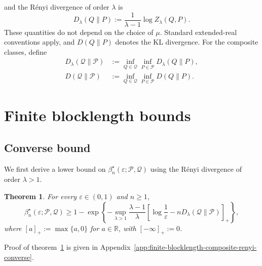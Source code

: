 \documentclass[journal,12pt,draftclsnofoot,onecolumn]{IEEEtran}
\newtheorem{theorem}{Theorem}
\begin{document}
and the R\'enyi divergence of order $\lambda$ is
\begin{equation}
D_\lambda(Q\|P):=\frac{1}{\lambda-1}\log Z_\lambda(Q,P).
\label{eq:renyi-divergence-definition}
\end{equation}
These quantities do not depend on the choice of $\mu$. Standard extended-real conventions apply, and $D(Q\|P)$ denotes the KL divergence. For the composite classes, define
\begin{equation}
\begin{aligned}
D_\lambda(\mathcal Q\|\mathcal P) &:= \inf_{Q\in\mathcal Q}
\inf_{P\in\mathcal P} D_\lambda(Q\|P),\\
D(\mathcal Q\|\mathcal P) &:= \inf_{Q\in\mathcal Q} \inf_{P\in\mathcal P} D(Q\|P).
\label{eq:inf-KL}
\end{aligned}
\end{equation}
\section{Finite blocklength bounds}
\label{sec:finite-blocklength-bounds}

\subsection{Converse bound}
\label{sec:composite-converse}

We first derive a lower bound on $\beta_n^\star(\varepsilon;\mathcal P,\mathcal Q)$ using the R\'enyi divergence of order $\lambda>1$. 

\begin{theorem}
\label{thm:finite-blocklength-composite-renyi-converse} For every $\varepsilon\in(0,1)$ and $n\geq1$,
\begin{equation}
\beta_n^\star(\varepsilon;\mathcal P,\mathcal Q)
\geq 1- \exp\left\{-\sup_{\lambda>1}
\frac{\lambda-1}{\lambda}\left[\log\frac{1}{\varepsilon}-nD_\lambda(\mathcal Q\|\mathcal P)
\right]_+\right\},
\label{eq:finite-blocklength-composite-renyi-converse}
\end{equation}
where $[a]_+:=\max\{a,0\}$ for $a\in\mathbb R$, with $[-\infty]_+:=0$. 
\end{theorem}
Proof of theorem~\ref{thm:finite-blocklength-composite-renyi-converse} is given in Appendix~\ref{app:finite-blocklength-composite-renyi-converse}.
\end{document}
